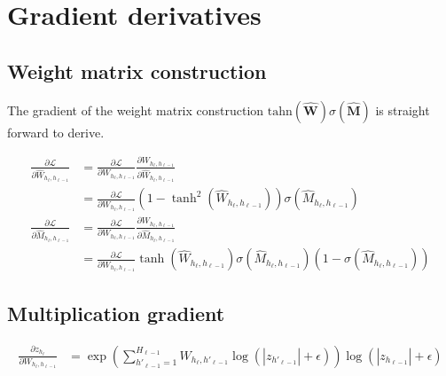 \section{Gradient derivatives}

\subsection{Weight matrix construction}

The gradient of the weight matrix construction $\mathrm{tahn}({\hat{\mathbf{W}}}) \sigma({\hat{\mathbf{M}}})$ is straight forward to derive.



\begin{equation}
\begin{aligned}
\frac{\partial\mathcal{L}}{\partial \hat{W}_{h_\ell, h_{\ell-1}}} &= \frac{\partial\mathcal{L}}{\partial W_{h_\ell, h_{\ell-1}}} \frac{\partial W_{h_\ell, h_{\ell-1}}}{\partial \hat{W}_{h_\ell, h_{\ell-1}}} \\
&= \frac{\partial\mathcal{L}}{\partial W_{h_\ell, h_{\ell-1}}} (1 - \tanh^2(\hat{W}_{h_\ell, h_{\ell-1}})) \sigma(\hat{M}_{h_\ell, h_{\ell-1}}) \\
\frac{\partial\mathcal{L}}{\partial \hat{M}_{h_\ell, h_{\ell-1}}} &= \frac{\partial\mathcal{L}}{\partial W_{h_\ell, h_{\ell-1}}} \frac{\partial W_{h_\ell, h_{\ell-1}}}{\partial \hat{M}_{h_\ell, h_{\ell-1}}} \\
&= \frac{\partial\mathcal{L}}{\partial W_{h_\ell, h_{\ell-1}}} \tanh(\hat{W}_{h_\ell, h_{\ell-1}}) \sigma(\hat{M}_{h_\ell, h_{\ell-1}}) (1 - \sigma(\hat{M}_{h_\ell, h_{\ell-1}}))
\end{aligned}
\end{equation}

\subsection{Multiplication gradient}

\begin{equation}
\begin{aligned}
\frac{\partial z_{h_\ell}}{\partial W_{h_\ell, h_{\ell-1}}} &= \exp\left(\sum_{h'_{\ell-1}=1}^{H_{\ell-1}} W_{h_{\ell}, h'_{\ell-1}} \log(|z_{h'_{\ell-1}}| + \epsilon) \right) \log(|z_{h_{\ell-1}}| + \epsilon)
\end{aligned}
\end{equation}
